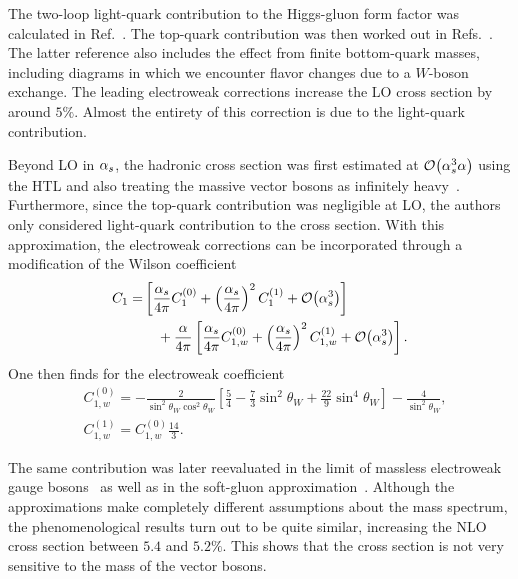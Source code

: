 The two-loop light-quark contribution to the Higgs-gluon form factor was calculated in Ref.~\cite{Aglietti:2004nj}. The top-quark contribution was then worked out in Refs.~\cite{Degrassi:2004mx, Actis:2008ts, Actis:2008ug}. The latter reference also includes the effect from finite bottom-quark masses, including diagrams in which we encounter flavor changes due to a $W$-boson exchange. The leading electroweak corrections increase the \acs{LO} cross section by around $5\%$. Almost the entirety of this correction is due to the light-quark contribution.

Beyond \acs{LO} in $\alpha_s$, the hadronic cross section was first estimated at $\mathcal{O}\!\left(\alpha_s^3 \alpha\right)$ using the \acs{HTL} and also treating the massive vector bosons as infinitely heavy~\cite{Anastasiou:2008tj}. Furthermore, since the top-quark contribution was negligible at \acs{LO}, the authors only considered light-quark contribution to the cross section. With this approximation, the electroweak corrections can be incorporated through a modification of the Wilson coefficient
\begin{equation}
\begin{split}
  C_1 = &\left[\frac{\alpha_s}{4 \pi} C_1^{(0)} + \left(\frac{\alpha_s}{4 \pi} \right)^2  C_1^{(1)} + \mathcal{O}\!\left(\alpha_s^3\right) \right] \\
  & \quad + \frac{\alpha}{4 \pi} \left[ \frac{\alpha_s}{4 \pi} C_{1,w}^{(0)} +  \left(\frac{\alpha_s}{4 \pi} \right)^2  C_{1,w}^{(1)} + \mathcal{O}\!\left(\alpha_s^3\right) \right].
\end{split}
\label{eq:4:ew_Wilson}
\end{equation}
One then finds for the electroweak coefficient
\begin{equation}
  \begin{split}
  &C_{1,w}^{(0)} = -  \frac{2}{\sin^2 \theta_W \cos^2 \theta_W} \left[ \frac{5}{4} - \frac{7}{3} \sin^2 \theta_W + \frac{22}{9} \sin^4 \theta_W \right] - \frac{4}{\sin^2 \theta_W}, \\
  &C_{1,w}^{(1)} = C_{1,w}^{(0)} \frac{14}{3}.
  \end{split}
\end{equation}

The same contribution was later reevaluated in the limit of massless electroweak gauge bosons~\cite{Anastasiou:2018adr} as well as in the soft-gluon approximation~\cite{Bonetti:2018ukf}. Although the approximations make completely different assumptions about the mass spectrum, the phenomenological results turn out to be quite similar, increasing the \acs{NLO} cross section between $5.4$ and $5.2\%$. This shows that the cross section is not very sensitive to the mass of the vector bosons.

